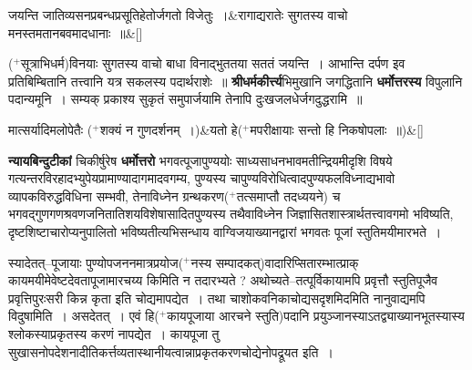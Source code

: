 \documentclass[article,12pt,a4paper]{memoir}
\newcommand{\add}[1]{($^{+}$#1)}
\begin{document}
	  \endgroup
	  
	    
	    \stanza[\smallbreak]
	जयन्ति जातिव्यसनप्रबन्धप्रसूतिहेतोर्जगतो विजेतुः ।&रागाद्यरातेः सुगतस्य वाचो मनस्तमतानबवमादधानाः ॥\&[\smallbreak]


	
	  \endgroup
	

	  \pstart \leavevmode{}\add{\edtext{\textsuperscript{*}}{\lemma{*}\Bfootnote{पत्रमत्र त्रुटितम्--सं०}}सूत्राभिधर्म}विनयाः सुगतस्य वाचो बाधा विनाद्भुततया सततं जयन्ति । आभान्ति दर्पण इव प्रतिबिम्बितानि तत्त्वानि यत्र सकलस्य पदार्थराशेः ॥ \textbf{श्रीधर्मकीर्त्त्य}भिमुखानि जगद्धितानि \textbf{धर्मोत्तरस्य} विपुलानि पदान्यमूनि । सम्यक् प्रकाश्य सुकृतं समुपार्जयामि तेनापि दुःखजलधेर्जगदुद्धरामि ॥
	\pend
      
	    
	    \stanza[\smallbreak]
	मात्सर्यादिमलोपेतैः \add{शक्यं न गुणदर्शनम् ।}&यतो हे\add{मपरीक्षायाः सन्तो हि निकषोपलाः ॥}\&[\smallbreak]


	

	  \pstart \textbf{न्यायबिन्दुटीकां} चिकीर्षुरेष \textbf{धर्मोत्तरो} भगवत्पूजापुण्ययोः साध्यसाधनभावमतीन्द्रियमीदृशि विषये गत्यन्तरविरहादभ्युपेयप्रामाण्यादागमादवगम्य, पुण्यस्य चापुण्यविरोधित्वादपुण्यफलविध्नाद्यभावो व्यापकविरुद्धविधिना सम्भवी, तेनाविध्नेन ग्रन्थकरण\add{तत्समाप्तौ  \leavevmode{} तदध्ययने} च भगवद्गुणगणश्रवणजनितातिशयविशेषासादितपुण्यस्य तथैवाविध्नेन जिज्ञासितशास्त्रार्थतत्त्वावगमो भविष्यति, दृष्टशिष्टाचारोप्यनुपालितो भविष्यतीत्यभिसन्धाय वाग्विजयाख्यानद्वारां भगवतः पूजां स्तुतिमयीमारभते ।
	\pend
      

	  \pstart स्यादेतत्--पूजायाः पुण्योपजननमात्रप्रयोज\add{नस्य सम्पादकत्}वादारिप्सितारम्भात्प्राक् कायमयीमेवेष्टदेवतापूजामारचय्य किमिति न तदारभ्यते ? अथोच्यते--तत्पूर्विकायामपि प्रवृत्तौ स्तुतिपूजैव प्रवृत्तिपुरःसरी किन्न कृता इति चोद्यमापद्येत । तथा चाशोकवनिकाचोद्यसदृशमिदमिति नानुवाद्यमपि विदुषामिति । असदेतत् । एवं हि\add{कायपूजाया आरचने स्तुति}पदानि प्रयुञ्जानस्याऽतद्व्याख्यानभूतस्यास्य श्लोकस्याप्रकृतस्य करणं नापद्येत । कायपूजा तु सुखासनोपदेशनादीतिकर्त्तव्यतास्थानीयत्वान्नाप्रकृतकरणचोद्येनोपद्रूयत इति ।
	\pend
      
\end{document}
